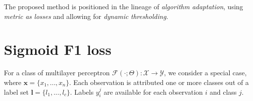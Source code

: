 \documentclass[sigconf,natbib,screen=true,review=true,anonymous]{acmart}
\begin{document}
The proposed method is positioned in the lineage of \emph{algorithm adaptation}, using \emph{metric as losses} and allowing for \emph{dynamic thresholding}. 



















\section{Sigmoid F1 loss}
\label{sec:orgb72bdc8}

For a class of multilayer perceptron \(\mathcal{F}(\cdot ; \Theta): \mathcal{X} \rightarrow \mathcal{Y}\), we consider a special case, where \(\mathbf{x} = \{x_1, ..., x_n\}\). Each observation is attributed one or more classes out of a label set \(\mathbf{l} = \{l_1, ..., l_c\}\). Labels \(y_{i}^{j}\) are available for each observation \(i\) and class \(j\). 
\end{document}
